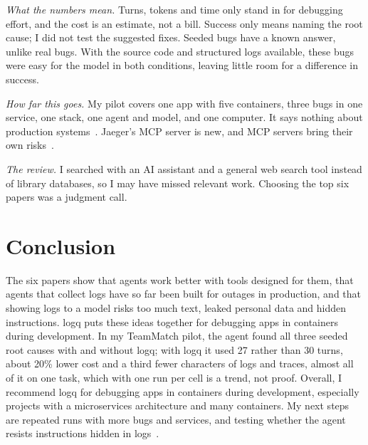 \documentclass[10pt,conference]{IEEEtran}
\begin{document}
\emph{What the numbers mean.} Turns, tokens and time only stand in for debugging effort, and the cost is an estimate, not a bill. Success only means naming the root cause; I did not test the suggested fixes. Seeded bugs have a known answer, unlike real bugs. With the source code and structured logs available, these bugs were easy for the model in both conditions, leaving little room for a difference in success.

\emph{How far this goes.} My pilot covers one app with five containers, three bugs in one service, one stack, one agent and model, and one computer. It says nothing about production systems~\cite{roy2024rcaagents}. Jaeger's MCP server is new, and MCP servers bring their own risks~\cite{hou2026mcp}.

\emph{The review.} I searched with an AI assistant and a general web search tool instead of library databases, so I may have missed relevant work. Choosing the top six papers was a judgment call.

\section{Conclusion}\label{sec:conclusion}

The six papers show that agents work better with tools designed for them, that agents that collect logs have so far been built for outages in production, and that showing logs to a model risks too much text, leaked personal data and hidden instructions. logq puts these ideas together for debugging apps in containers during development. In my TeamMatch pilot, the agent found all three seeded root causes with and without logq; with logq it used 27 rather than 30 turns, about 20\% lower cost and a third fewer characters of logs and traces, almost all of it on one task, which with one run per cell is a trend, not proof. Overall, I recommend logq for debugging apps in containers during development, especially projects with a microservices architecture and many containers. My next steps are repeated runs with more bugs and services, and testing whether the agent resists instructions hidden in logs~\cite{greshake2023injection}.



\end{document}

